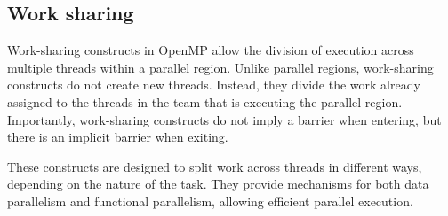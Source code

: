 \subsection{Work sharing}
Work-sharing constructs in OpenMP allow the division of execution across multiple threads within a parallel region. 
Unlike parallel regions, work-sharing constructs do not create new threads. 
Instead, they divide the work already assigned to the threads in the team that is executing the parallel region. 
Importantly, work-sharing constructs do not imply a barrier when entering, but there is an implicit barrier when exiting.

These constructs are designed to split work across threads in different ways, depending on the nature of the task. 
They provide mechanisms for both data parallelism and functional parallelism, allowing efficient parallel execution.



